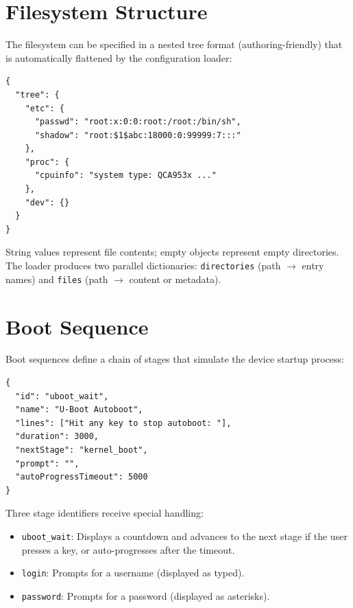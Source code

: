 \section{Filesystem Structure}\label{sec:app-tc-fs}

The filesystem can be specified in a nested tree format (authoring-friendly) that is automatically flattened by the configuration loader:

\noindent\begin{minipage}{\linewidth}
\begin{lstlisting}[language={}, caption={Filesystem tree notation.}]
{
  "tree": {
    "etc": {
      "passwd": "root:x:0:0:root:/root:/bin/sh",
      "shadow": "root:$1$abc:18000:0:99999:7:::"
    },
    "proc": {
      "cpuinfo": "system type: QCA953x ..."
    },
    "dev": {}
  }
}
\end{lstlisting}
\end{minipage}

String values represent file contents; empty objects represent empty directories. The loader produces two parallel dictionaries: \texttt{directories} (path $\rightarrow$ entry names) and \texttt{files} (path $\rightarrow$ content or metadata).

\section{Boot Sequence}\label{sec:app-tc-boot}

Boot sequences define a chain of stages that simulate the device startup process:

\noindent\begin{minipage}{\linewidth}
\begin{lstlisting}[language={}, caption={Boot stage example.}]
{
  "id": "uboot_wait",
  "name": "U-Boot Autoboot",
  "lines": ["Hit any key to stop autoboot: "],
  "duration": 3000,
  "nextStage": "kernel_boot",
  "prompt": "",
  "autoProgressTimeout": 5000
}
\end{lstlisting}
\end{minipage}

Three stage identifiers receive special handling:
\begin{itemize}
    \item \texttt{uboot\_wait}: Displays a countdown and advances to the next stage if the user presses a key, or auto-progresses after the timeout.
    \item \texttt{login}: Prompts for a username (displayed as typed).
    \item \texttt{password}: Prompts for a password (displayed as asterisks).
\end{itemize}

